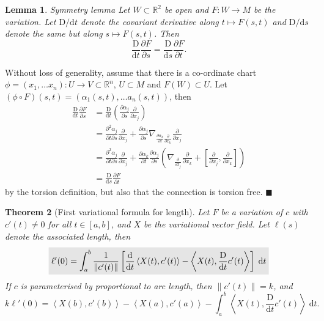\documentclass[letter-paper]{tufte-book}
\newtheorem{theorem}{\color{pastel-blue}Theorem}[section]
\newtheorem{lemma}[theorem]{\color{pastel-blue}Lemma}
\newenvironment{proof}[1][Proof]{\begin{trivlist}
\item[\hskip \labelsep {\bfseries #1}]}{\end{trivlist}}
\newcommand{\qed}{\hfill$\blacksquare$}
\newcommand{\highlight}[1]{\mathchoice%
  {\colorbox{black!10}{$\displaystyle#1$}}%
  {\colorbox{black!10}{$\textstyle#1$}}%
  {\colorbox{black!10}{$\scriptstyle#1$}}%
  {\colorbox{black!10}{$\scriptscriptstyle#1$}}}%
\begin{document}
\begin{lemma}{Symmetry lemma}
  Let $W\subset \mathbb{R}^2$ be open and $F: W\to M$ be the variation. Let $\mathrm{D}/\mathrm{d}t$ denote the covariant derivative along $t\mapsto F(s,t)$ and $\mathrm{D}/\mathrm{d}s$ denote the same but along $s\mapsto F(s,t)$. Then
  \begin{equation}
    \frac{\mathrm{D}}{\mathrm{d}t} \frac{\partial F}{\partial s} = \frac{\mathrm{D}}{\mathrm{d}s} \frac{\partial F}{\partial t}.
  \end{equation}
\end{lemma}

\begin{proof}
  Without loss of generality, assume that there is a co-ordinate chart $\phi = (x_1, \ldots x_n) : U \to V \subset \mathbb{R}^n$, $U \subset M$ and $F(W) \subset U$. Let $(\phi\circ F)(s,t) = (\alpha_1 (s,t), \ldots a_n(s,t))$, then
  \begin{align*}
    \frac{\mathrm{D}}{\mathrm{d}t} \frac{\partial F}{\partial s}
      &= \frac{\mathrm{D}}{\mathrm{d}t} \left(\frac{\partial \alpha_j}{\partial s}\frac{\partial}{\partial x_j}\right)\\
      &= \frac{\partial^2 \alpha_j}{\partial t\partial s}\frac{\partial}{\partial x_j} + \frac{\partial \alpha_j}{\partial s}\nabla_{\frac{\partial \alpha_k}{\partial t}\frac{\partial}{\partial x_k}}\frac{\partial}{\partial x_j}\\
      &= \frac{\partial^2 \alpha_j}{\partial t\partial s}\frac{\partial}{\partial x_j} + \frac{\partial \alpha_k}{\partial t}\frac{\partial \alpha_j}{\partial s} \left(\nabla_{\frac{\partial}{\partial x_j}}\frac{\partial}{\partial x_k} + \left[\frac{\partial}{\partial x_j}, \frac{\partial}{\partial x_k}\right]\right)\\
      &= \frac{\mathrm{D}}{\mathrm{d}s} \frac{\partial F}{\partial t}
  \end{align*}
  by the torsion definition, but also that the connection is torsion free. \qed
\end{proof}

\begin{theorem}[First variational formula for length]
  Let $F$ be a variation of $c$ with $c'(t) \neq 0$ for all $t\in[a,b]$, and $X$ be the variational vector field. Let $\ell(s)$ denote the associated length, then
  \begin{equation}
    \highlight{ \ell'(0) = \int_a^b \frac{1}{\|c'(t)\|} \left[ \frac{\mathrm{d}}{\mathrm{d}t}\left\langle X(t), c'(t)\right\rangle - \left\langle X(t), \frac{\mathrm{D}}{\mathrm{d}t}c'(t)\right\rangle\right] \; \mathrm{d}t }
  \end{equation}
  If $c$ is parameterised by proportional to arc length, then $\|c'(t)\| = k$, and
  \begin{equation}
    k\ell'(0) = \left\langle X(b), c'(b)\right\rangle - \left\langle X(a), c'(a)\right\rangle - \int_a^b \left\langle X(t), \frac{\mathrm{D}}{\mathrm{d}t}c'(t)\right\rangle \; \mathrm{d}t.
  \end{equation}
\end{theorem}
\end{document}
